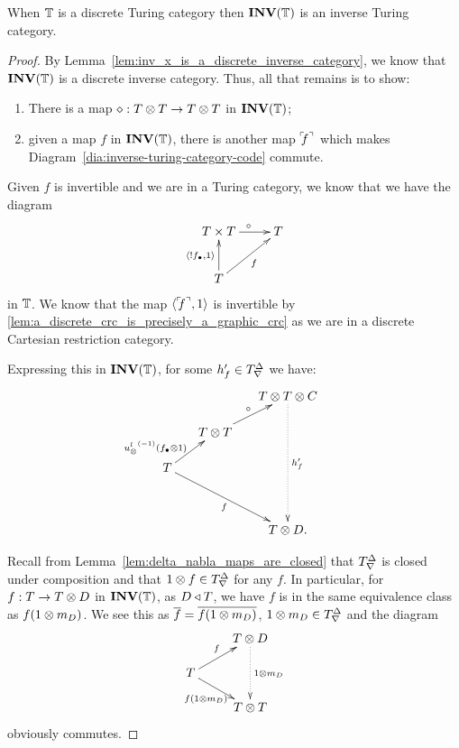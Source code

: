 \begin{lemma}\label{lem:discrete_turing_category_inverses_make_inverse_turing_category}
  When $\mathbb{T}$ is a discrete Turing category then $\mathbf{INV}({\mathbb{T}})$ is an inverse Turing category.
\end{lemma}
\begin{proof}
  By Lemma~\ref{lem:inv_x_is_a_discrete_inverse_category}, we know that $\mathbf{INV}({\mathbb{T}})$ is a discrete
  inverse category. Thus, all that remains is to show:
  \begin{enumerate}[{(}i{)}]
    \item There is a map $\diamond:T\otimes T \to T\otimes T$ in $\mathbf{INV}({\mathbb{T}})$;
    \item given a  map $f$ in $\mathbf{INV}({\mathbb{T}})$, there is another map ${}^\ulcorner\!\!f^\urcorner$ which makes
      Diagram~\ref{dia:inverse-turing-category-code} commute.
  \end{enumerate}

  Given $f$ is invertible and we are in a Turing category, we know that we have the diagram
      \[
        \xymatrix{
          T\times T \ar[r]^{\circ} & T \\
          T \ar[ur]_{f} \ar[u]^{\<!\code{f},1\>}
        }
      \]
  in $\mathbb{T}$.   We know that the  map $\langle{}^\ulcorner\!\!f^\urcorner,1\rangle$ is invertible by
  \ref{lem:a_discrete_crc_is_precisely_a_graphic_crc} as we are in a discrete Cartesian restriction
  category.

  Expressing this in $\mathbf{INV}({\mathbb{T}})$, for some $h'_f \in {T}^{\Delta}_{\nabla}$ we have:
  \begin{equation}
    \xymatrix @C=15pt @R=15pt{
      & & T \* T\*C \ar@{.>}[dddd]^{h'_f}\\
      &T\*T \ar[ur]^{\circ} & & \\
      T \ar[ur]^(.3){\inv{\usl}(\code{f}\*1)} \ar[ddrr]_{f} \\
      & & & \\
      && T\*D.
    }\label{dia:pre-inverse-turing}
  \end{equation}

  Recall from Lemma~\ref{lem:delta_nabla_maps_are_closed} that ${T}^{\Delta}_{\nabla}$ is closed under
  composition and that $1\otimes f\in {T}^{\Delta}_{\nabla}$ for any $f$. In particular, for $f:T\to T\otimes D$ in
  $\mathbf{INV}({\mathbb{T}})$, as $D\triangleleft T$, we have $f$ is in the same equivalence class as $f(1\otimes m_D)$. We see
  this as $\overline{f} = \overline{f(1\otimes m_D)}$, $1\otimes m_D\in {T}^{\Delta}_{\nabla}$ and the diagram
  \[
    \xymatrix@R-10pt{
      &T\*D \ar@{.>}[dd]^{1\*m_D}\\
      T \ar[ur]^{f} \ar[dr]_{f(1\*m_D)}& \\
      &T\*T
    }
  \]
  obviously commutes.


\end{proof}
